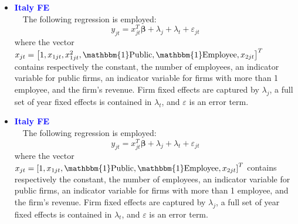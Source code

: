 \documentclass[12pt,notitlepage]{article}
\newcommand{\sym}[1] {\ifmmode^{#1} \else\(^{#1}\) \fi}
\begin{document}
\begin{itemize}
\clearpage
\item \textcolor{blue}{\textbf{Italy FE}}\\~\
The following regression is employed:
	\begin{equation}
	y_{jt} = x^{T}_{jt}\mathbf{\beta} + \lambda_{j}  + \lambda_{t} + \varepsilon_{jt}
	\end{equation}
where the vector $x_{jt} = \left[  1, x_{1jt}, x^{2}_{1jt}, \mathbbm{1}\text{Public}, \mathbbm{1}\text{Employee}, x_{2jt} \right]^{T} $ contains respectively the constant, the number of employees, an indicator variable for public firms, an indicator variable for firms with more than 1 employee, and the firm's revenue. Firm fixed effects are captured by $\lambda_{j}$, a full set of year fixed effects is contained in $\lambda_{t}$, and $\varepsilon$ is an error term.
\begin{table}[htbp]\centering
\def\sym#1{\ifmmode^{#1}\else\(^{#1}\)\fi}
\caption{Haltiwanger growth rate}
\end{table}
\clearpage
\item \textcolor{blue}{\textbf{Italy FE}}\\~\
The following regression is employed:
	\begin{equation}
	y_{jt} = x^{T}_{jt}\mathbf{\beta} + \lambda_{j}  + \lambda_{t} + \varepsilon_{jt}
	\end{equation}
where the vector $x_{jt} = \left[  1, x_{1jt}, \mathbbm{1}\text{Public}, \mathbbm{1}\text{Employee}, x_{2jt} \right]^{T} $ contains respectively the constant, the number of employees, an indicator variable for public firms, an indicator variable for firms with more than 1 employee, and the firm's revenue. Firm fixed effects are captured by $\lambda_{j}$, a full set of year fixed effects is contained in $\lambda_{t}$, and $\varepsilon$ is an error term.
\begin{table}[htbp]\centering
\def\sym#1{\ifmmode^{#1}\else\(^{#1}\)\fi}
\caption{Haltiwanger growth rate}
\end{table}






\end{itemize}
\end{document}
